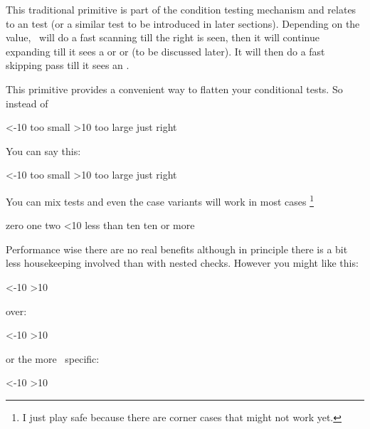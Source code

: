 This traditional primitive is part of the condition testing mechanism and relates
to an  test (or a similar test to be introduced in later
sections). Depending on the value, \TEX\ will do a fast scanning till the right
 is seen, then it will continue expanding till it sees a 
or  or  (to be discussed later). It will then do a
fast skipping pass till it sees an .

\stopoldprimitive

\startnewprimitive[title={\prm {orelse}}]

This primitive provides a convenient way to flatten your conditional tests. So
instead of

\starttyping
\ifnum\scratchcounter<-10
    too small
\else\ifnum\scratchcounter>10
    too large
\else
    just right
\fi\fi
\stoptyping

You can say this:

\starttyping
\ifnum\scratchcounter<-10
    too small
\orelse\ifnum\scratchcounter>10
    too large
\else
    just right
\fi
\stoptyping

You can mix tests and even the case variants will work in most cases \footnote {I
just play safe because there are corner cases that might not work yet.}

\starttyping
\ifcase\scratchcounter          zero
\or                             one
\or                             two
\orelse\ifnum\scratchcounter<10 less than ten
\else                           ten or more
\fi
\stoptyping

Performance wise there are no real benefits although in principle there is a bit
less housekeeping involved than with nested checks. However you might like this:

\starttyping
\ifnum\scratchcounter<-10
    \expandafter\toosmall
\orelse\ifnum\scratchcounter>10
    \expandafter\toolarge
\else
    \expandafter\justright
\fi
\stoptyping

over:

\starttyping
\ifnum\scratchcounter<-10
    \expandafter\toosmall
\else\ifnum\scratchcounter>10
    \expandafter\expandafter\expandafter\toolarge
\else
    \expandafter\expandafter\expandafter\justright
\fi\fi
\stoptyping

or the more \CONTEXT\ specific:

\starttyping
\ifnum\scratchcounter<-10
    \expandafter\toosmall
\else\ifnum\scratchcounter>10
    \doubleexpandafter\toolarge
\else
    \doubleexpandafter\justright
\fi\fi
\stoptyping

